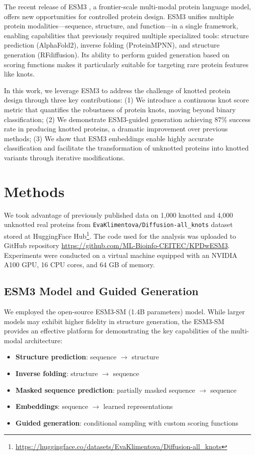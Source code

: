 \documentclass{article}
\theoremstyle{plain}
\theoremstyle{definition}
\theoremstyle{remark}
\begin{document}
The recent release of ESM3 \citep{hayes2025simulating}, a frontier-scale multi-modal protein language model, offers new opportunities for controlled protein design. ESM3 unifies multiple protein modalities—sequence, structure, and function—in a single framework, enabling capabilities that previously required multiple specialized tools: structure prediction (AlphaFold2), inverse folding (ProteinMPNN), and structure generation (RFdiffusion). Its ability to perform guided generation based on scoring functions makes it particularly suitable for targeting rare protein features like knots.

In this work, we leverage ESM3 to address the challenge of knotted protein design through three key contributions: (1) We introduce a continuous knot score metric that quantifies the robustness of protein knots, moving beyond binary classification; (2) We demonstrate ESM3-guided generation achieving 87\% success rate in producing knotted proteins, a dramatic improvement over previous methods; (3) We show that ESM3 embeddings enable highly accurate classification and facilitate the transformation of unknotted proteins into knotted variants through iterative modifications.

\section{Methods}

We took advantage of previously published data on 1,000 knotted and 4,000 unknotted real proteins from \texttt{EvaKlimentova/Diffusion-all\_knots} dataset stored at HuggingFace Hub\footnote{\url{https://huggingface.co/datasets/EvaKlimentova/Diffusion-all_knots}}. The code used for the analysis was uploaded to GitHub repository \url{https://github.com/ML-Bioinfo-CEITEC/KPDwESM3}. Experiments were conducted on a virtual machine equipped with an NVIDIA A100 GPU, 16 CPU cores, and 64 GB of memory.

\subsection{ESM3 Model and Guided Generation}

We employed the open-source ESM3-SM (1.4B parameters) model. While larger models may exhibit higher fidelity in structure generation, the ESM3-SM provides an effective platform for demonstrating the key capabilities of the multi-modal architecture:
\begin{itemize}
    \item \textbf{Structure prediction}: sequence $\rightarrow$ structure
    \item \textbf{Inverse folding}: structure $\rightarrow$ sequence
    \item \textbf{Masked sequence prediction}: partially masked sequence $\rightarrow$ sequence
    \item \textbf{Embeddings}: sequence $\rightarrow$ learned representations
    \item \textbf{Guided generation}: conditional sampling with custom scoring functions
\end{itemize}
\end{document}
